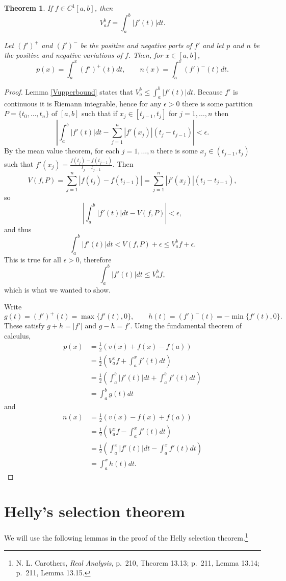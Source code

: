 \documentclass{article}
\newtheorem{theorem}{Theorem}
\theoremstyle{definition}
\begin{document}
\begin{theorem}
If $f \in C^1[a,b]$, then 
\[
V_a^b f = \int_a^b |f'(t)| dt.
\]

Let $(f')^+$ and $(f')^-$ be the positive and negative parts of $f'$ and let
$p$ and $n$ be the positive and negative variations of $f$. Then, for $x \in [a,b]$,
\[
p(x) = \int_a^x (f')^+(t) dt, \qquad n(x) = \int_a^x (f')^-(t) dt.
\]
\end{theorem}
\begin{proof}
Lemma \ref{Vupperbound} states that $V_a^b \leq \int_a^b |f'(t)| dt$. 
Because $f'$ is continuous it is Riemann integrable, hence for any $\epsilon>0$ there is some partition $P=\{t_0,\ldots,t_n\}$
of $[a,b]$ such that if $x_j \in [t_{j-1},t_j]$ for $j=1,\ldots,n$ then
\[
\left| \int_a^b |f'(t)| dt - \sum_{j=1}^n |f'(x_j)|(t_j-t_{j-1}) \right| < \epsilon.
\]
By the mean value theorem,  for each $j=1,\ldots,n$ there is some
$x_j \in (t_{j-1},t_j)$ such that $f'(x_j)=\frac{f(t_j)-f(t_{j-1})}{t_j-t_{j-1}}$. Then
\[
V(f,P) = \sum_{j=1}^n |f(t_j)-f(t_{j-1})|
=\sum_{j=1}^n |f'(x_j)| (t_j-t_{j-1}),
\]
so
\[
\left| \int_a^b |f'(t)| dt - V(f,P) \right| < \epsilon,
\]
and thus
\[
\int_a^b |f'(t)| dt < V(f,P)+\epsilon \leq V_a^b f + \epsilon.
\]
This is true for all $\epsilon>0$, therefore
\[
\int_a^b |f'(t)| dt \leq V_a^b f,
\]
which is what we wanted to show.

Write
\[
g(t)=(f')^+(t) = \max\{f'(t),0\}, \qquad
h(t)=(f')^-(t) = -\min\{f'(t),0\}.
\]
These satisfy $g+h=|f'|$ and $g-h = f'$. Using the fundamental theorem of calculus,
\begin{align*}
p(x)&=\frac{1}{2}\left( v(x) + f(x)-f(a) \right)\\
&=\frac{1}{2}\left( V_a^x f + \int_a^x f'(t) dt \right)\\
&=\frac{1}{2}\left( \int_a^b |f'(t)| dt + \int_a^b f'(t) dt\right)\\
&=\int_a^b  g(t) dt
\end{align*}
and
\begin{align*}
n(x)&=\frac{1}{2}\left(v(x)-f(x)+f(a)\right)\\
&=\frac{1}{2}\left(V_a^x f - \int_a^x f'(t) dt \right)\\
&=\frac{1}{2}\left( \int_a^x |f'(t)| dt - \int_a^x f'(t) dt \right)\\
&=\int_a^x h(t) dt.
\end{align*}
\end{proof}


\section{Helly's selection theorem}
We will use the following lemmas in the proof of the Helly selection theorem.\footnote{N. L. Carothers, {\em Real Analysis}, p.~210, Theorem 13.13;
p.~211, Lemma 13.14; p.~211, Lemma 13.15.}
\end{document}
